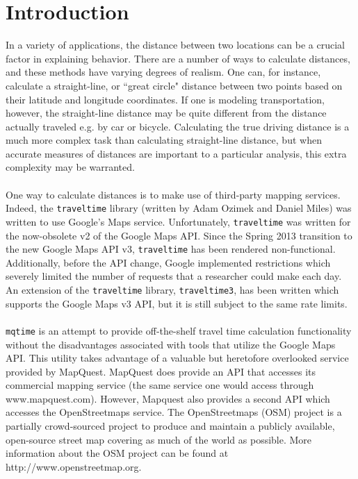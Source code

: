 \documentclass[11pt]{article}
\begin{document}
\section{Introduction}
In a variety of applications, the distance between two locations can be a crucial factor in explaining behavior. There are a number of ways to calculate distances, and these methods have varying degrees of realism. One can, for instance, calculate a straight-line, or ``great circle" distance between two points based on their latitude and longitude coordinates. If one is modeling transportation, however, the straight-line distance may be quite different from the distance actually traveled e.g. by car or bicycle. Calculating the true driving distance is a much more complex task than calculating straight-line distance, but when accurate measures of distances are important to a particular analysis, this extra complexity may be warranted.
\\ \\
One way to calculate distances is to make use of third-party mapping services. Indeed, the \verb|traveltime| library (written by Adam Ozimek and Daniel Miles) was written to use Google's Maps service. Unfortunately, \verb|traveltime| was written for the now-obsolete v2 of the Google Maps API. Since the Spring 2013 transition to the new Google Maps API v3, \verb|traveltime| has been rendered non-functional. Additionally, before the API change, Google implemented restrictions which severely limited the number of requests that a researcher could make each day. An extension of the \verb|traveltime| library, \verb|traveltime3|, has been written which supports the Google Maps v3 API, but it is still subject to the same rate limits. 
\\ \\
\verb|mqtime| is an attempt to provide off-the-shelf travel time calculation functionality without the disadvantages associated with tools that utilize the Google Maps API. This utility takes advantage of a valuable but heretofore overlooked service provided by MapQuest. MapQuest does provide an API that accesses its commercial mapping service (the same service one would access through www.mapquest.com). However, Mapquest also provides a second API which accesses the OpenStreetmaps service. The OpenStreetmaps (OSM) project is a partially crowd-sourced project to produce and maintain a publicly available, open-source street map covering as much of the world as possible. More information about the OSM project can be found at http://www.openstreetmap.org. 
\end{document}
